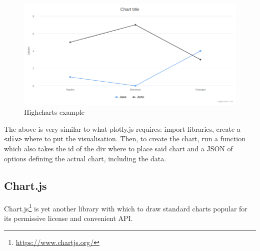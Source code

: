 \documentclass[
]{krantz}
\renewcommand{\href}[2]{#2\footnote{\url{#1}}}
\begin{document}
\begin{figure}[t]

{\centering \includegraphics[width=1\linewidth]{images/candidate-highcharts} 

}

\caption{Highcharts example}\label{fig:candidate-highcharts}
\end{figure}

The above is very similar to what plotly.js requires: import libraries, create a \texttt{\textless{}div\textgreater{}} where to put the visualisation. Then, to create the chart, run a function which also takes the id of the div where to place said chart and a JSON of options defining the actual chart, including the data.

\hypertarget{widgets-basics-candidates-chart.js}{%
\subsection{Chart.js}\label{widgets-basics-candidates-chart.js}}

\href{https://www.chartjs.org/}{Chart.js} is yet another library with which to draw standard charts popular for its permissive license and convenient API.
\end{document}
